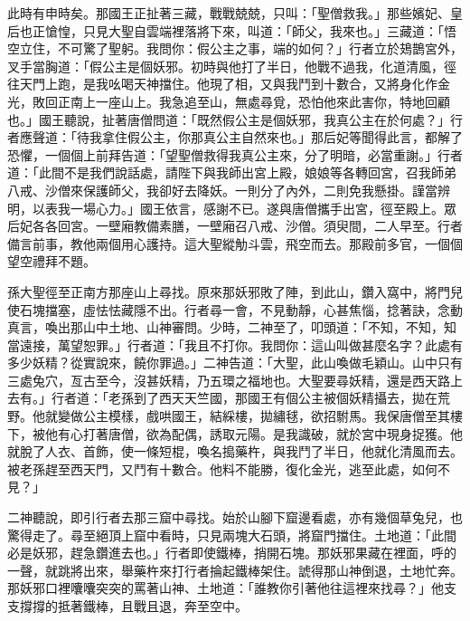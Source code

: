 此時有申時矣。那國王正扯著三藏，戰戰兢兢，只叫：「聖僧救我。」那些嬪妃、皇后也正愴惶，只見大聖自雲端裡落將下來，叫道：「師父，我來也。」三藏道：「悟空立住，不可驚了聖躬。我問你：假公主之事，端的如何？」行者立於鳷鵲宮外，叉手當胸道：「假公主是個妖邪。初時與他打了半日，他戰不過我，化道清風，徑往天門上跑，是我吆喝天神擋住。他現了相，又與我鬥到十數合，又將身化作金光，敗回正南上一座山上。我急追至山，無處尋覓，恐怕他來此害你，特地回顧也。」國王聽說，扯著唐僧問道：「既然假公主是個妖邪，我真公主在於何處？」行者應聲道：「待我拿住假公主，你那真公主自然來也。」那后妃等聞得此言，都解了恐懼，一個個上前拜告道：「望聖僧救得我真公主來，分了明暗，必當重謝。」行者道：「此間不是我們說話處，請陛下與我師出宮上殿，娘娘等各轉回宮，召我師弟八戒、沙僧來保護師父，我卻好去降妖。一則分了內外，二則免我懸掛。謹當辨明，以表我一場心力。」國王依言，感謝不已。遂與唐僧攜手出宮，徑至殿上。眾后妃各各回宮。一壁廂教備素膳，一壁廂召八戒、沙僧。須臾間，二人早至。行者備言前事，教他兩個用心護持。這大聖縱觔斗雲，飛空而去。那殿前多官，一個個望空禮拜不題。

孫大聖徑至正南方那座山上尋找。原來那妖邪敗了陣，到此山，鑽入窩中，將門兒使石塊擋塞，虛怯怯藏隱不出。行者尋一會，不見動靜，心甚焦惱，捻著訣，念動真言，喚出那山中土地、山神審問。少時，二神至了，叩頭道：「不知，不知，知當遠接，萬望恕罪。」行者道：「我且不打你。我問你：這山叫做甚麼名字？此處有多少妖精？從實說來，饒你罪過。」二神告道：「大聖，此山喚做毛穎山。山中只有三處兔穴，亙古至今，沒甚妖精，乃五環之福地也。大聖要尋妖精，還是西天路上去有。」行者道：「老孫到了西天天竺國，那國王有個公主被個妖精攝去，拋在荒野。他就變做公主模樣，戲哄國王，結綵樓，拋繡毬，欲招駙馬。我保唐僧至其樓下，被他有心打著唐僧，欲為配偶，誘取元陽。是我識破，就於宮中現身捉獲。他就脫了人衣、首飾，使一條短棍，喚名搗藥杵，與我鬥了半日，他就化清風而去。被老孫趕至西天門，又鬥有十數合。他料不能勝，復化金光，逃至此處，如何不見？」

二神聽說，即引行者去那三窟中尋找。始於山腳下窟邊看處，亦有幾個草兔兒，也驚得走了。尋至絕頂上窟中看時，只見兩塊大石頭，將窟門擋住。土地道：「此間必是妖邪，趕急鑽進去也。」行者即使鐵棒，捎開石塊。那妖邪果藏在裡面，呼的一聲，就跳將出來，舉藥杵來打行者掄起鐵棒架住。諕得那山神倒退，土地忙奔。那妖邪口裡囔囔突突的罵著山神、土地道：「誰教你引著他往這裡來找尋？」他支支撐撐的抵著鐵棒，且戰且退，奔至空中。

